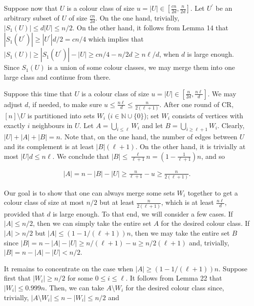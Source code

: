 \documentclass[10pt,a4paper]{article}
\begin{document}
Suppose now that $U$ is a colour class of size $u=|U|\in[\frac{cn}{2d},\frac{n}{2d}]$. Let $U^{\prime}$ be an arbitrary subset of $U$ of size $\frac{cn}{2d}$. On the one hand, trivially, $|S_{1}(U)|\leq d|U|\leq n/2$. On the other hand, it follows from Lemma 14 that $|S_{1}(U^{\prime})|\geq|U^{\prime}|d/2=cn/4$ which implies that $|S_{1}(U)|\geq|S_{1}(U^{\prime})|-|U|\geq cn/4-n/2d\geq n\ell/d$, when $d$ is large enough. Since $S_{1}(U)$ is a union of some colour classes, we may merge them into one large class and continue from there.\par




Suppose this time that $U$ is a colour class of size $u=|U|\in[\frac{n}{2d},\frac{n\ell}{d}]$. We may adjust $d$, if needed, to make sure $u\leq\frac{n\ell}{d}\leq\frac{n}{2(\ell+1)}$. After one round of CR, $[n]\setminus U$ is partitioned into sets $W_{i}$ ($i\in\mathbb{N}\cup\{0\}$); set $W_{i}$ consists of vertices with exactly $i$ neighbours in $U$. Let $A=\bigcup_{i\leq\ell}W_{i}$ and let $B=\bigcup_{i\geq\ell+1}W_{i}$. Clearly, $|U|+|A|+|B|=n$. Note that, on the one hand, the number of edges between $U$ and its complement is at least $|B|(\ell+1)$. On the other hand, it is trivially at most $|U|d\leq n\ell$. We conclude that
$|B|\leq\frac{\ell}{\ell+1}n=\left(1-\frac{1}{\ell+1}\right)n$,
and so\par


\[\begin{gathered}
|A|=n-|B|-|U|\geq\frac{n}{\ell+1}-u\geq\frac{n}{2(\ell+1)}.
\end{gathered}\]




Our goal is to show that one can always merge some sets $W_{i}$ together to get a colour class of size at most $n/2$ but at least $\frac{n}{2(\ell+1)}$, which is at least $\frac{n\ell}{d}$, provided that $d$ is large enough. To that end, we will consider a few cases. If $|A|\leq n/2$, then we can simply take the entire set $A$ for the desired colour class. If $|A|>n/2$ but $|A|\leq(1-1/(\ell+1))n$, then we may take the entire set $B$ since $|B|=n-|A|-|U|\geq n/(\ell+1)-u\geq n/2(\ell+1)$ and, trivially, $|B|=n-|A|-|U|<n/2$.\par




It remains to concentrate on the case when $|A|\geq(1-1/(\ell+1))n$. Suppose first that $|W_{i}|\geq n/2$ for some $0\leq i\leq\ell$. It follows from Lemma 22 that $|W_{i}|\leq 0.999n$. Then, we can take $A\setminus W_{i}$ for the desired colour class since, trivially, $|A\setminus W_{i}|\leq n-|W_{i}|\leq n/2$ and\par
\end{document}
